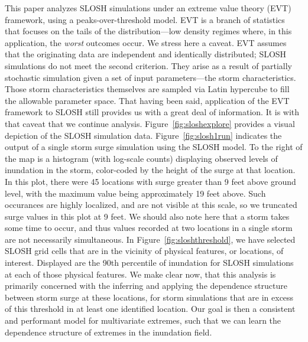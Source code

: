 This paper analyzes SLOSH simulations under an extreme value theory (EVT) framework, 
    using a peaks-over-threshold model.  EVT is a branch of statistics
    that focuses on the tails of the distribution---low density regimes where,
    in this application, the \emph{worst} outcomes occur.  
    We stress here a caveat. EVT assumes that the originating data are independent
    and identically distributed; SLOSH simulations do not meet the second criterion.
    They arise as a result of partially stochastic simulation given a set of input
    parameters---the storm characteristics.  Those storm characteristics themselves
    are sampled via Latin hypercube to fill the allowable parameter space.  That
    having been said, application of the EVT framework to SLOSH still provides us
    with a great deal of information.  It is with that caveat that we continue analysis.
    Figure~\ref{fig:sloshexplore} provides a visual depiction of the SLOSH 
    simulation data.  Figure~\ref{fig:slosh1run} indicates the output of a single 
    storm surge simulation using the SLOSH model. To the right of the map is a 
    histogram (with log-scale counts) displaying observed levels of inundation 
    in the storm, color-coded by the height of the surge at that location.  In this
    plot, there were 45 locations with surge greater than 9 feet above ground level,
    with the maximum value being approximately 19 feet above.  Such occurances
    are highly localized, and are not visible at this scale, so we truncated surge values
    in this plot at 9 feet.  We should also 
    note here that a storm takes some time to occur, and thus values recorded at 
    two locations in a single storm are not necessarily simultaneous.
    In Figure~\ref{fig:sloshthreshold}, we have selected SLOSH grid 
    cells that are in the vicinity of physical features, or locations, of 
    interest.  Displayed are the 90th percentile 
    of inundation for SLOSH simulations at each of those physical features.
    We make clear now, that this analysis is primarily concerned with the
    inferring and applying the dependence structure between storm surge at these locations,
    for storm simulations
    that are in excess of this threshold in at least one identified location.
    Our goal is then a consistent and performant model for multivariate extremes, 
    such that we can learn the dependence structure of extremes in the inundation field.

